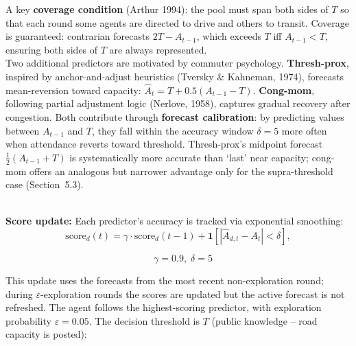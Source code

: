 A key \textbf{coverage condition} (Arthur 1994): the pool must span both sides of $T$ so that each round some agents are directed to drive and others to transit. Coverage is guaranteed: contrarian forecasts $2T - A_{t-1}$, which exceeds $T$ iff $A_{t-1} < T$, ensuring both sides of $T$ are always represented. \\

Two additional predictors are motivated by commuter psychology. \textbf{Thresh-prox}, inspired by anchor-and-adjust heuristics (Tversky \& Kahneman, 1974), forecasts mean-reversion toward capacity: $\hat{A}_t = T + 0.5(A_{t-1} - T)$. \textbf{Cong-mom}, following partial adjustment logic (Nerlove, 1958), captures gradual recovery after congestion. Both contribute through \textbf{forecast calibration}: by predicting values between $A_{t-1}$ and $T$, they fall within the accuracy window $\delta = 5$ more often when attendance reverts toward threshold. Thresh-prox's midpoint forecast $\frac{1}{2}(A_{t-1}+T)$ is systematically more accurate than `last' near capacity; cong-mom offers an analogous but narrower advantage only for the supra-threshold case (Section~5.3).

\\

\textbf{Score update:} Each predictor's accuracy is tracked via exponential smoothing: \\

$$
\text{score}_d(t) = \gamma \cdot \text{score}_d(t{-}1) + \mathbf{1}\!\left[|\hat{A}_{d,t} - A_t| < \delta\right], 
$$

$$
\quad \gamma = 0.9,\; \delta = 5
$$

This update uses the forecasts from the most recent non-exploration round; during $\varepsilon$-exploration rounds the scores are updated but the active forecast is not refreshed. The agent follows the highest-scoring predictor, with exploration probability $\varepsilon = 0.05$. The decision threshold is $T$ (public knowledge -- road capacity is posted): \\

